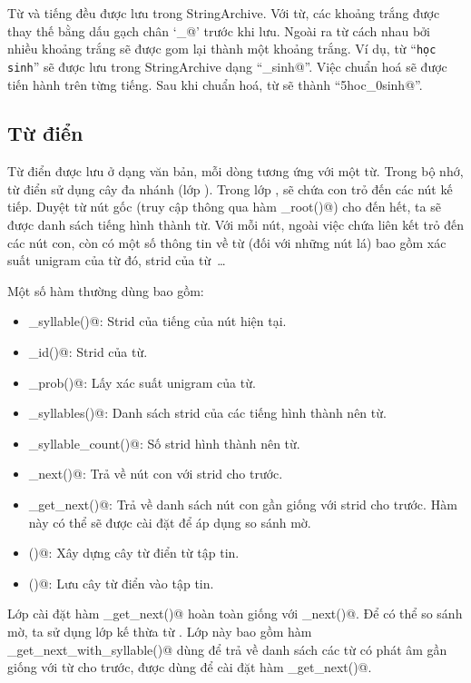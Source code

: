 \documentclass[a4paper,oneside,14pt]{extbook} %
\begin{document}
Từ và tiếng đều được lưu trong StringArchive. Với từ, các khoảng trắng
được thay thế bằng dấu gạch chân `\verb@_@' trước khi lưu. Ngoài ra từ
cách nhau bởi nhiều khoảng trắng sẽ được gom lại thành một khoảng
trắng. Ví dụ, từ ``\texttt{học   sinh}'' sẽ được lưu trong StringArchive
dạng ``_sinh@''. Việc chuẩn hoá sẽ được tiến hành trên từng
tiếng. Sau khi chuẩn hoá, từ sẽ thành ``\verb@5hoc_0sinh@''.

\subsection{Từ điển}

Từ điển được lưu ở dạng văn bản, mỗi dòng tương ứng với một từ. Trong
bộ nhớ, từ điển sử dụng cây đa nhánh (lớp \verb@WordNode@). Trong lớp
\verb@WordNode@, \verb@nodes@ sẽ chứa con trỏ đến các nút kế tiếp. Duyệt
từ nút gốc (truy cập thông qua hàm \verb@get_root()@) cho đến hết, ta
sẽ được danh sách tiếng hình thành từ. Với mỗi nút, ngoài việc chứa
liên kết trỏ đến các nút con, còn có một số thông tin về từ (đối với
những nút lá) bao gồm xác suất unigram của từ đó, strid của từ~\ldots

Một số hàm thường dùng bao gồm:
\begin{itemize}
\item \verb@get_syllable()@: Strid của tiếng của nút hiện tại.
\item \verb@get_id()@: Strid của từ.
\item \verb@get_prob()@: Lấy xác suất unigram của từ.
\item \verb@get_syllables()@: Danh sách strid của các tiếng hình thành
  nên từ.
\item \verb@get_syllable_count()@: Số strid hình thành nên từ.
\item \verb@get_next()@: Trả về nút con với strid cho trước.
\item \verb@fuzzy_get_next()@: Trả về danh sách nút con gần giống với
  strid cho trước. Hàm này có thể sẽ được cài đặt để áp dụng so sánh
  mờ.
\item \verb@load()@: Xây dựng cây từ điển từ tập tin.
\item \verb@save()@: Lưu cây từ điển vào tập tin.
\end{itemize}

Lớp \verb@WordNode@ cài đặt hàm \verb@fuzzy_get_next()@ hoàn toàn giống
với \verb@get_next()@. Để có thể so sánh mờ, ta sử dụng lớp
\verb@FuzzyWordNode@ kế thừa từ \verb@WordNode@. Lớp này bao gồm hàm
\verb@fuzzy_get_next_with_syllable()@ dùng để trả về danh sách các từ có
phát âm gần giống với từ cho trước, được dùng để cài đặt hàm \verb@fuzzy_get_next()@.
\end{document}
